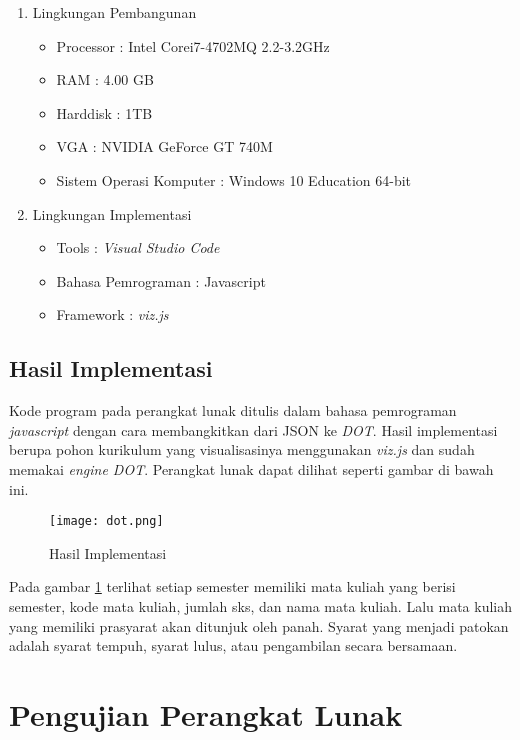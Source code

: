 \begin{enumerate}
\item Lingkungan Pembangunan 
\begin{itemize}
\item Processor : Intel Corei7-4702MQ 2.2-3.2GHz
\item RAM : 4.00 GB
\item Harddisk : 1TB
\item VGA : NVIDIA GeForce GT 740M
\item Sistem Operasi Komputer : Windows 10 Education 64-bit
\end{itemize}

\item Lingkungan Implementasi
\begin{itemize}
\item Tools : \textit{Visual Studio Code}
\item Bahasa Pemrograman : Javascript
\item Framework : \textit{viz.js}
\end{itemize}

\end{enumerate}

\subsection{Hasil Implementasi}
\label{sec: Hasil Implementasi}

Kode program pada perangkat lunak ditulis dalam bahasa pemrograman \textit{javascript} dengan cara membangkitkan dari JSON ke \textit{DOT}. Hasil implementasi berupa pohon kurikulum yang visualisasinya menggunakan \textit{viz.js} dan sudah memakai \textit{engine DOT}. Perangkat lunak dapat dilihat seperti gambar di bawah ini.

\begin{figure}[H]
		\texttt{[image: dot.png]}
		\caption{Hasil Implementasi}
		\label{fig: pohon kurikulum}
\end{figure}	 

Pada gambar \ref{fig: pohon kurikulum} terlihat setiap semester memiliki mata kuliah yang berisi semester, kode mata kuliah, jumlah sks, dan nama mata kuliah. Lalu mata kuliah yang memiliki prasyarat akan ditunjuk oleh panah. Syarat yang menjadi patokan adalah syarat tempuh, syarat lulus, atau pengambilan secara bersamaan.

\section{Pengujian Perangkat Lunak}
\label{sec: Pengujian Perangkat Lunak}


